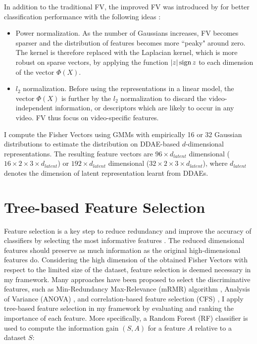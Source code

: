In addition to the traditional FV, the improved FV was introduced by \cite{perronnin2010} for better classification performance with the following ideas :
\begin{itemize}
    \item Power normalization. As the number of Gaussians increases, FV becomes sparser and the distribution of features becomes more ``peaky" around zero. The kernel is therefore replaced with the Laplacian kernel, which is more robust on sparse vectors, by applying the function $|z| \operatorname{sign} z$ to each dimension of the vector $\Phi(X)$. 
    \item $l_2$ normalization. Before using the representations in a linear model, the vector $\Phi(X)$ is further by the $l_2$ normalization to discard the video-independent information, or descriptors which are likely to occur in any video. FV thus focus on video-specific features.
\end{itemize}

I compute the Fisher Vectors using GMMs with empirically 16 or 32 Gaussian distributions \cite{syed2018, dibekliouglu2017} to estimate the distribution on DDAE-based $d$-dimensional representations. The resulting feature vectors are $96 \times d_{latent}$ dimensional ($16 \times 2 \times 3 \times d_{latent}$) or $192 \times d_{latent}$ dimensional ($32 \times 2 \times 3 \times d_{latent}$), where $d_{latent}$ denotes the dimension of latent representation learnt from DDAEs.





\section{Tree-based Feature Selection}

Feature selection is a key step to reduce redundancy and improve the accuracy of classifiers by selecting the most informative features \cite{hira2015}. The reduced dimensional features should preserve as much information as the original high-dimensional features do. Considering the high dimension of the obtained Fisher Vectors with respect to the limited size of the dataset, feature selection is deemed necessary in my framework. Many approaches have been proposed to select the discriminative features, such as Min-Redundancy Max-Relevance (mRMR) algorithm \cite{peng2005}, Analysis of Variance (ANOVA) \cite{moran1918}, and correlation-based feature selection (CFS) \cite{pudil1994}, I apply tree-based feature selection in my framework by evaluating and ranking the importance of each feature. More specifically, a Random Forest (RF) classifier is used to compute the information gain $(S,A)$ for a feature $A$ relative to a dataset $S$: 

